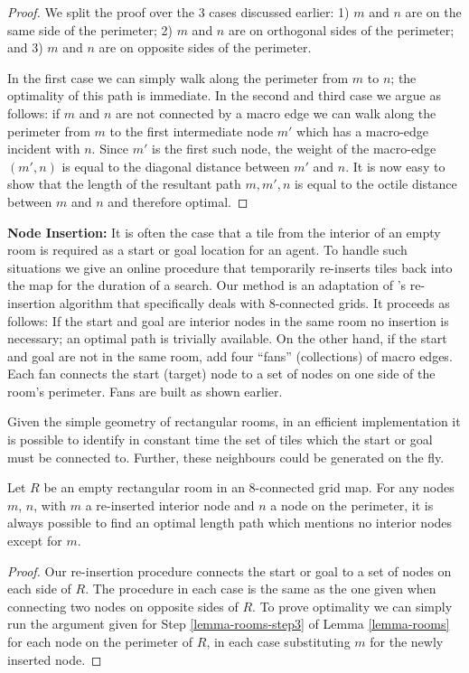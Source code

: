 \begin{proof}
We split the proof over the 3 cases discussed earlier:
1) {$m$ and $n$ are on the same side of the perimeter;}
2) {$m$ and $n$ are on orthogonal sides of the perimeter;} and
3) {\label{lemma-rooms-step3} $m$ and $n$ are on opposite sides of the perimeter.}

In the first case we can simply walk along the perimeter from $m$ to $n$; the optimality of this path is immediate. 
In the second and third case we argue as follows: if $m$ and $n$ are not connected by a macro edge
we can walk along the perimeter from $m$ to the first intermediate node $m'$
which has a macro-edge incident with $n$. 
Since $m'$ is the first such node, the weight of the macro-edge $(m', n)$ is equal to
the diagonal distance between $m'$ and $n$. 
It is now easy to show that the length of the resultant path ${m, m', n}$ is equal to the octile distance between 
$m$ and $n$ and therefore optimal.
\end{proof}

\noindent
\textbf{Node Insertion:}
It is often the case that a tile from the interior of an empty room is required as a start or goal location for an
agent. 
To handle such situations we give an online procedure that temporarily re-inserts tiles back into the map for the duration
of a search. 
Our method is an adaptation of \citeauthor{harabor10}'s re-insertion algorithm
that specifically deals with 8-connected grids.
It proceeds as follows:
{If the start and goal are interior nodes in the same room no insertion is necessary; an optimal
path is trivially available. }
{On the other hand, if the start and goal are not in the same room, add four ``fans'' (collections) of macro edges.
Each fan connects the start (target) node to a set of nodes on one side of the room's perimeter.
Fans are built as shown earlier.}

Given the simple geometry of rectangular rooms,
in an efficient implementation it is possible to identify in constant time the set of tiles which 
the start or goal must be connected to.
Further, these neighbours could be generated on the fly.

\begin{lemma}
\label{lemma-insertion}
Let $R$ be an empty rectangular room in an 8-connected grid map.
For any nodes $m$, $n$, with $m$ a re-inserted interior node and $n$ a node on the perimeter, it is always possible to
find an optimal length path which mentions no interior nodes except for $m$.
\end{lemma}
\begin{proof}
Our re-insertion procedure connects the start or goal to a set of nodes on each side of $R$.
The procedure in each case is the same as the one given when connecting two nodes on opposite sides of $R$.
To prove optimality we can simply run the argument given for Step \ref{lemma-rooms-step3} of Lemma \ref{lemma-rooms} for each
node on the perimeter of $R$, in each case substituting $m$ for the newly inserted node.
\end{proof}

